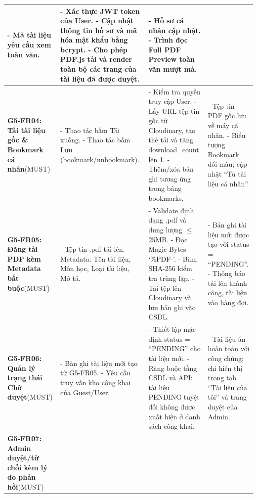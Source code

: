 \begin{table}[H]
\begin{tabularx}{\textwidth}{|p{3.6cm}|p{3.2cm}|X|p{3.2cm}|}
- Mã tài liệu yêu cầu xem toàn văn. & 
- Xác thực JWT token của User.\newline
- Cập nhật thông tin hồ sơ và mã hóa mật khẩu bằng bcrypt.\newline
- Cho phép PDF.js tải và render toàn bộ các trang của tài liệu đã được duyệt. & 
- Hồ sơ cá nhân cập nhật.\newline
- Trình đọc Full PDF Preview toàn văn mượt mà. \\
\hline
\textbf{G5-FR04: Tải tài liệu gốc \& Bookmark cá nhân}\newline(MUST) & 
- Thao tác bấm Tải xuống.\newline
- Thao tác bấm Lưu (bookmark/unbookmark). & 
- Kiểm tra quyền truy cập User.\newline
- Lấy URL tệp tin gốc từ Cloudinary, tạo thẻ tải và tăng download\_count lên 1.\newline
- Thêm/xóa bản ghi tương ứng trong bảng bookmarks. & 
- Tệp tin PDF gốc lưu về máy cá nhân.\newline
- Biểu tượng Bookmark đổi màu; cập nhật ``Tủ tài liệu cá nhân''. \\
\hline
\textbf{G5-FR05: Đăng tải PDF kèm Metadata bắt buộc}\newline(MUST) & 
- Tệp tin .pdf tải lên.\newline
- Metadata: Tên tài liệu, Môn học, Loại tài liệu, Mô tả. & 
- Validate định dạng .pdf và dung lượng $\le$ 25MB.\newline
- Đọc Magic Bytes `\%PDF-'.\newline
- Băm SHA-256 kiểm tra trùng lặp.\newline
- Tải tệp lên Cloudinary và lưu bản ghi vào CSDL. & 
- Bản ghi tài liệu mới được tạo với status = ``PENDING''.\newline
- Thông báo tải lên thành công, tài liệu vào hàng đợi. \\
\hline
\textbf{G5-FR06: Quản lý trạng thái Chờ duyệt}\newline(MUST) & 
- Bản ghi tài liệu mới tạo từ G5-FR05.\newline
- Yêu cầu truy vấn kho công khai của Guest/User. & 
- Thiết lập mặc định status = ``PENDING'' cho tài liệu mới.\newline
- Ràng buộc tầng CSDL và API: tài liệu PENDING tuyệt đối không được xuất hiện ở danh sách công khai. & 
- Tài liệu ẩn hoàn toàn với công chúng; chỉ hiển thị trong tab ``Tài liệu của tôi'' và trang duyệt của Admin. \\
\hline
\textbf{G5-FR07: Admin duyệt/từ chối kèm lý do phản hồi}\newline(MUST) & 

\end{tabularx}
\end{table}
